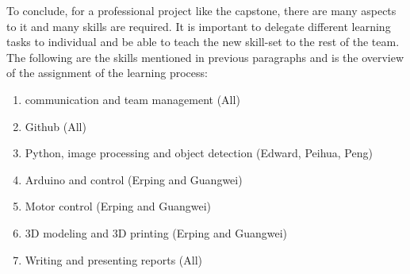 \documentclass[12pt]{article}
\begin{document}
To conclude, for a professional project like the capstone, there are many aspects to it and many skills are required. It is important to delegate different learning tasks to individual and be able to teach the new skill-set to the rest of the team. The following are the skills mentioned in previous paragraphs and is the overview of the assignment of the learning process:


\begin{enumerate}
  \item communication and team management (All)
  \item Github (All)
  \item Python, image processing and object detection (Edward, Peihua, Peng)
  \item Arduino and control (Erping and Guangwei)
  \item Motor control (Erping and Guangwei)
  \item 3D modeling and 3D printing (Erping and Guangwei)
  \item Writing and presenting reports (All)
\end{enumerate}
\end{document}
